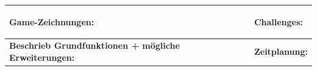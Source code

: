 \begin{landscape}
    \noindent
    \begin{tabularx}{.95\pageheight}{X|X}
        \begin{minipage}[t][0.48\textheight][t]{\linewidth}
            \textbf{Game-Zeichnungen}:
            \begin{center}
                \fbox{\parbox[c][0.2\textheight][c]{0.475\linewidth}{$\;$}}
                \fbox{\parbox[c][0.2\textheight][c]{0.475\linewidth}{$\;$}}
                \fbox{\parbox[c][0.2\textheight][c]{0.475\linewidth}{$\;$}}
                \fbox{\parbox[c][0.2\textheight][c]{0.475\linewidth}{$\;$}}
            \end{center}
        \end{minipage}
         &
        \begin{minipage}[t][0.48\textheight][t]{\linewidth}
            \textbf{Challenges:}
        \end{minipage}
        \\
        \midrule
        \begin{minipage}[t][0.48\textheight][t]{\linewidth}
            \textbf{Beschrieb Grundfunktionen + mögliche Erweiterungen:}

        \end{minipage}
         &
        \begin{minipage}[t][0.48\textheight][t]{\linewidth}
            \textbf{Zeitplanung:}
        \end{minipage}
    \end{tabularx}

\end{landscape}
\restoregeometry
